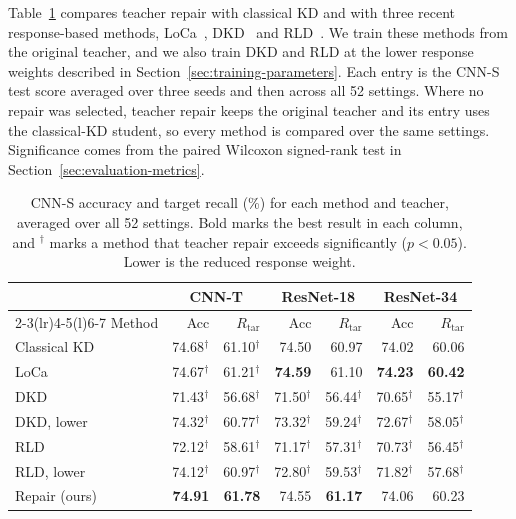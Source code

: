 \documentclass[10pt,journal,compsoc]{IEEEtran}
\theoremstyle{definition}
\begin{document}
Table~\ref{tab:loss-results} compares teacher repair with classical KD
and with three recent response-based methods,
LoCa~\cite{yang2024loca}, DKD~\cite{zhao2022decoupled} and
RLD~\cite{sun2025knowledge}. We train these methods from the original
teacher, and we also train DKD and RLD at the lower response weights
described in Section~\ref{sec:training-parameters}. Each entry is the
CNN-S test score averaged over three seeds and then across all 52
settings. Where no repair was selected, teacher repair keeps the
original teacher and its entry uses the classical-KD student, so every
method is compared over the same settings. Significance comes from the
paired Wilcoxon signed-rank test in
Section~\ref{sec:evaluation-metrics}.

\begin{table}[htb]
\caption{CNN-S accuracy and target recall (\%) for each method and
teacher, averaged over all 52 settings. Bold marks the best result in
each column, and $^{\dagger}$ marks a method that teacher repair
exceeds significantly ($p<0.05$). Lower is the reduced response
weight.}
\label{tab:loss-results}
\centering
\footnotesize
\setlength{\tabcolsep}{2.5pt}
\renewcommand{\arraystretch}{1.1}
\vspace{-3pt}
\begin{tabular}{@{}lrrrrrr@{}}
\toprule
& \multicolumn{2}{c}{CNN-T} & \multicolumn{2}{c}{ResNet-18} & \multicolumn{2}{c}{ResNet-34} \\
\cmidrule(lr){2-3}\cmidrule(lr){4-5}\cmidrule(l){6-7}
Method & Acc & $R_{\mathrm{tar}}$ & Acc & $R_{\mathrm{tar}}$ & Acc & $R_{\mathrm{tar}}$ \\
\midrule
Classical KD & 74.68$^{\dagger}$ & 61.10$^{\dagger}$ & 74.50 & 60.97 & 74.02 & 60.06 \\
LoCa & 74.67$^{\dagger}$ & 61.21$^{\dagger}$ & \textbf{74.59} & 61.10 & \textbf{74.23} & \textbf{60.42} \\
DKD & 71.43$^{\dagger}$ & 56.68$^{\dagger}$ & 71.50$^{\dagger}$ & 56.44$^{\dagger}$ & 70.65$^{\dagger}$ & 55.17$^{\dagger}$ \\
DKD, lower & 74.32$^{\dagger}$ & 60.77$^{\dagger}$ & 73.32$^{\dagger}$ & 59.24$^{\dagger}$ & 72.67$^{\dagger}$ & 58.05$^{\dagger}$ \\
RLD & 72.12$^{\dagger}$ & 58.61$^{\dagger}$ & 71.17$^{\dagger}$ & 57.31$^{\dagger}$ & 70.73$^{\dagger}$ & 56.45$^{\dagger}$ \\
RLD, lower & 74.12$^{\dagger}$ & 60.97$^{\dagger}$ & 72.80$^{\dagger}$ & 59.53$^{\dagger}$ & 71.82$^{\dagger}$ & 57.68$^{\dagger}$ \\
\midrule
Repair (ours) & \textbf{74.91} & \textbf{61.78} & 74.55 & \textbf{61.17} & 74.06 & 60.23 \\
\bottomrule
\end{tabular}
\vspace{-3pt}
\end{table}
\end{document}
